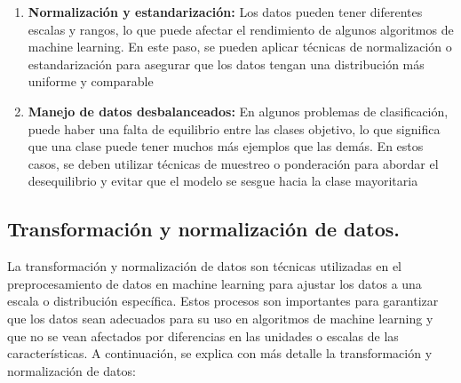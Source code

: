 \documentclass[../main.tex]{subfiles}
\begin{document}
\begin{enumerate}
            \item \textbf{Normalización y estandarización:} Los datos pueden tener diferentes escalas y rangos, lo que puede afectar el rendimiento de algunos algoritmos de machine learning. En este paso, se pueden aplicar técnicas de normalización o estandarización para asegurar que los datos tengan una distribución más uniforme y comparable
            \item \textbf{Manejo de datos desbalanceados:} En algunos problemas de clasificación, puede haber una falta de equilibrio entre las clases objetivo, lo que significa que una clase puede tener muchos más ejemplos que las demás. En estos casos, se deben utilizar técnicas de muestreo o ponderación para abordar el desequilibrio y evitar que el modelo se sesgue hacia la clase mayoritaria
        \end{enumerate}

    \subsection*{Transformación y normalización de datos.}
        La transformación y normalización de datos son técnicas utilizadas en el preprocesamiento de datos en machine learning para ajustar los datos a una escala o distribución específica. Estos procesos son importantes para garantizar que los datos sean adecuados para su uso en algoritmos de machine learning y que no se vean afectados por diferencias en las unidades o escalas de las características. A continuación, se explica con más detalle la transformación y normalización de datos:
	
\end{document}
